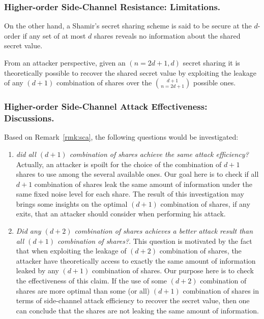 \documentclass{llncs}
\begin{document}
\subsubsection{Higher-order Side-Channel Resistance: Limitations.} On the other hand, a Shamir's secret sharing scheme is said to be secure at the $d$\myth-order if any set of at most $d$ shares reveals no information about the shared secret value. 

\begin{remark}
From an attacker perspective, given an $(n=2d+1,d)$ secret sharing it is theoretically possible to recover the shared secret value by exploiting the leakage of any $(d+1)$ combination of shares over the $d+1 \choose n=2d+1$ possible ones. 
\label{rmk:sca}
\end{remark}
\subsubsection{Higher-order Side-Channel Attack Effectiveness: Discussions.} 
Based on Remark~\ref{rmk:sca}, the following questions would be investigated:
\begin{enumerate}
\item \emph{did all $(d+1)$ combination of shares achieve the same attack efficiency?} Actually, an attacker is spoilt for the choice of the combination of $d+1$ shares to use among the several available ones. Our goal here is to check if all $d+1$ combination of shares leak the same amount of information under the same fixed noise level for each share. The result of this investigation may brings some insights on the optimal $(d+1)$ combination of shares, if any exits, that an attacker should consider when performing his attack.

\item \emph{Did any $(d+2)$ combination of shares achieves a better attack result than all $(d+1)$ combination of shares?}. This question is motivated by the fact that when exploiting the leakage of $(d+2)$ combination of shares, the attacker have theoretically access to exactly the same amount of information leaked by any $(d+1)$ combination of shares. Our purpose here is to check the effectiveness of this claim. If the use of some $(d+2)$ combination of shares are more optimal than some (or all) $(d+1)$ combination of shares in terms of side-channel attack efficiency to recover the  secret value, then one can conclude that the shares are not leaking the same amount of information.
\end{enumerate}    
\end{document}
